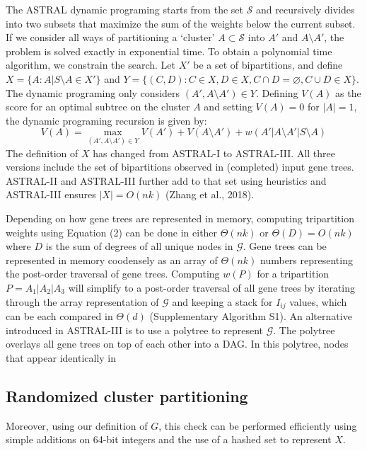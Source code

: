 \documentclass[12pt]{article}
\begin{document}
The ASTRAL dynamic programing starts from the set $\mathcal{S}$ and recursively divides into two subsets that maximize the sum of the weights below the current subset. If we consider all ways of partitioning a `cluster' $A \subset \mathcal{S}$ into $A'$ and $A \setminus A'$, the problem is solved exactly in exponential time. To obtain a polynomial time algorithm, we constrain the search. Let $X'$ be a set of bipartitions, and define $X=\{ A : A | S \setminus A \in X' \}$ and $Y=\{(C, D) : C \in X, D \in X, C \cap D = \varnothing, C \cup D \in X\}$. The dynamic programing only considers $(A', A \setminus A') \in Y$. Defining $V(A)$ as the score for an optimal subtree on the cluster $A$ and setting $V(A)=0$ for $|A|=1$, the dynamic programing recursion is given by:
\begin{equation}
V(A) = \max_{(A', A \setminus A') \in Y} V(A') + V(A \setminus A') + w(A'|A \setminus A'|S \setminus A)
\end{equation}
The definition of $X$ has changed from ASTRAL-I to ASTRAL-III. All three versions include the set of bipartitions observed in (completed) input gene trees. ASTRAL-II and ASTRAL-III further add to that set using heuristics and ASTRAL-III ensures $|X|=O(n k)$ (Zhang et al., 2018).

Depending on how gene trees are represented in memory, computing tripartition weights using Equation (2) can be done in either $\Theta(n k)$ or $\Theta(D)=O(n k)$ where $D$ is the sum of degrees of all unique nodes in $\mathcal{G}$. Gene trees can be represented in memory coodensely as an array of $\Theta(n k)$ numbers representing the post-order traversal of gene trees. Computing $w(P)$ for a tripartition $P=A_1|A_2|A_3$ will simplify to a post-order traversal of all gene trees by iterating through the array representation of $\mathcal{G}$ and keeping a stack for $I_{i j}$ values, which can be each compared in $\Theta(d)$ (Supplementary Algorithm S1). An alternative introduced in ASTRAL-III is to use a polytree to represent $\mathcal{G}$. The polytree overlays all gene trees on top of each other into a DAG. In this polytree, nodes that appear identically in

\subsection{Randomized cluster partitioning}
Moreover, using our definition of $G$, this check can be performed efficiently using simple additions on 64-bit integers and the use of a hashed set to represent $X$.
\end{document}
